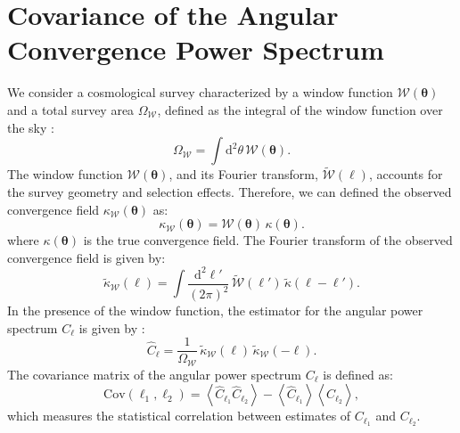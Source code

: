 \section{Covariance of the Angular Convergence Power Spectrum}
We consider a cosmological survey characterized by a window function \( \mathcal{W}(\boldsymbol{\theta}) \) and a total survey area \( \Omega_{\mathcal{W}} \), defined as the integral of the window function over the sky \citep{PhysRevD.87.123504}:
\begin{equation}
    \Omega_{\mathcal{W}} = \int \mathrm{d}^2 \theta \, \mathcal{W}(\boldsymbol{\theta}).
\end{equation}
The window function \( \mathcal{W}(\boldsymbol{\theta}) \), and its Fourier transform, \( \tilde{\mathcal{W}}(\boldsymbol{\ell}) \), accounts for the survey geometry and selection effects. 
Therefore, we can defined the observed convergence field \( \kappa_{\mathcal{W}}(\boldsymbol{\theta}) \) as:
\begin{equation}
    \kappa_{\mathcal{W}}(\boldsymbol{\theta}) = \mathcal{W}(\boldsymbol{\theta}) \, \kappa(\boldsymbol{\theta}).
\end{equation}
where \( \kappa(\boldsymbol{\theta}) \) is the true convergence field.
The Fourier transform of the observed convergence field is given by:
\begin{equation}
    \tilde{\kappa}_{\mathcal{W}}(\boldsymbol{\ell}) = \int \frac{\mathrm{d}^2 \ell'}{(2\pi)^2} \, \tilde{\mathcal{W}}(\boldsymbol{\ell}') \, \tilde{\kappa}(\boldsymbol{\ell} - \boldsymbol{\ell}').
\end{equation}
In the presence of the window function, the estimator for the angular power spectrum \( C_\ell \) is given by \citep{PhysRevD.87.123504}:
\begin{equation}
    \hat{C}_\ell = \frac{1}{\Omega_{\mathcal{W}}} \, \tilde{\kappa}_{\mathcal{W}}(\boldsymbol{\ell}) \, \tilde{\kappa}_{\mathcal{W}}(-\boldsymbol{\ell}).
\end{equation}
The covariance matrix of the angular power spectrum \( C_\ell \) is defined as:
\begin{equation}
    \mathrm{Cov}(\ell_1, \ell_2) = \left\langle \hat{C}_{\ell_1} \hat{C}_{\ell_2} \right\rangle - \left\langle \hat{C}_{\ell_1} \right\rangle \left\langle \hat{C}_{\ell_2} \right\rangle,
\end{equation}
which measures the statistical correlation between estimates of \( C_{\ell_1} \) and \( C_{\ell_2} \).

